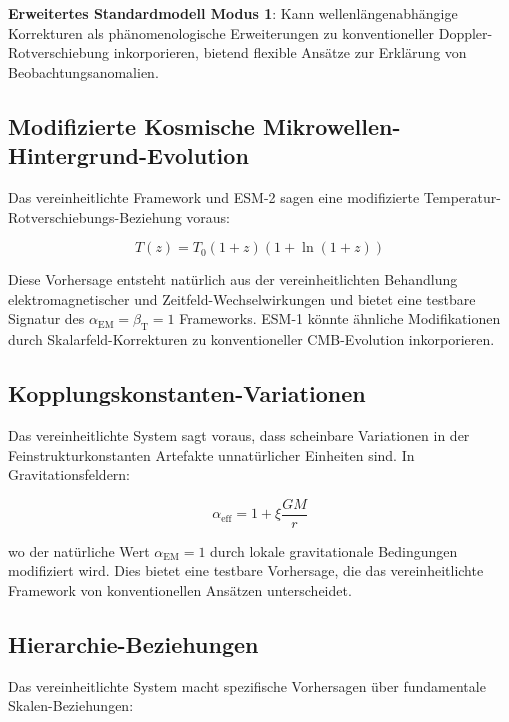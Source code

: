 \documentclass[12pt,a4paper]{article}
\newcommand{\alphaEM}{\alpha_{\text{EM}}}
\newcommand{\betaT}{\beta_{\text{T}}}
\newcommand{\xipar}{\xi}
\begin{document}
	\textbf{Erweitertes Standardmodell Modus 1}: Kann wellenlängenabhängige Korrekturen als phänomenologische Erweiterungen zu konventioneller Doppler-Rotverschiebung inkorporieren, bietend flexible Ansätze zur Erklärung von Beobachtungsanomalien.
	
	\subsection{Modifizierte Kosmische Mikrowellen-Hintergrund-Evolution}
	\label{subsec:cmb_evolution}
	
	Das vereinheitlichte Framework und ESM-2 sagen eine modifizierte Temperatur-Rotverschiebungs-Beziehung voraus:
	
	\begin{equation}
		T(z) = T_0(1+z)(1+\ln(1+z))
	\end{equation}
	
	Diese Vorhersage entsteht natürlich aus der vereinheitlichten Behandlung elektromagnetischer und Zeitfeld-Wechselwirkungen und bietet eine testbare Signatur des $\alphaEM = \betaT = 1$ Frameworks. ESM-1 könnte ähnliche Modifikationen durch Skalarfeld-Korrekturen zu konventioneller CMB-Evolution inkorporieren.
	
	\subsection{Kopplungskonstanten-Variationen}
	\label{subsec:coupling_variations}
	
	Das vereinheitlichte System sagt voraus, dass scheinbare Variationen in der Feinstrukturkonstanten Artefakte unnatürlicher Einheiten sind. In Gravitationsfeldern:
	
	\begin{equation}
		\alpha_{\text{eff}} = 1 + \xipar \frac{GM}{r}
	\end{equation}
	
	wo der natürliche Wert $\alphaEM = 1$ durch lokale gravitationale Bedingungen modifiziert wird. Dies bietet eine testbare Vorhersage, die das vereinheitlichte Framework von konventionellen Ansätzen unterscheidet.
	
	\subsection{Hierarchie-Beziehungen}
	\label{subsec:hierarchy_relationships}
	
	Das vereinheitlichte System macht spezifische Vorhersagen über fundamentale Skalen-Beziehungen:
	
\end{document}
